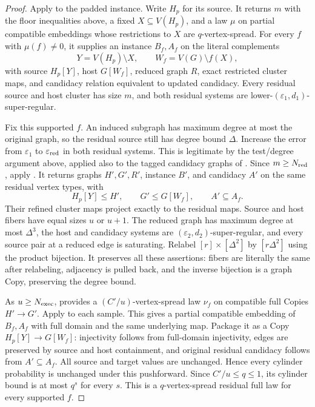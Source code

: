\begin{proof}
Apply  to the padded instance. Write $H_p$
for its source. It returns $m$ with the floor inequalities above, a fixed
$X\subseteq V(H_p)$, and a law $\mu$ on partial compatible embeddings
whose restrictions to $X$ are $q$-vertex-spread. For every $f$ with
$\mu(f)\ne0$, it supplies an instance $B_f,A_f$ on the literal complements
\[
 Y=V(H_p)\setminus X,\qquad W_f=V(G)\setminus f(X),
\]
with source $H_p[Y]$, host $G[W_f]$, reduced graph $R$, exact restricted
cluster maps, and candidacy relation equivalent to updated candidacy.
Every residual source and host cluster has size $m$, and both residual
systems are lower-$(\varepsilon_1,d_1)$-super-regular.

Fix this supported $f$. An induced subgraph has maximum degree at most
the original graph, so the residual source still has degree bound $\Delta$.
Increase the error from $\varepsilon_1$ to $\varepsilon_{\rm red}$ in
both residual systems. This is legitimate by the test/degree argument
above, applied also to the tagged candidacy graphs of
. Since $m\geq N_{\rm red}$, apply
. It returns graphs $H',G',R'$,
instance $B'$, and candidacy $A'$ on the same residual vertex types, with
\[
 H_p[Y]\leq H',\qquad G'\leq G[W_f],\qquad A'\subseteq A_f.
\]
Their refined cluster maps project exactly to the residual maps. Source
and host fibers have equal sizes $u$ or $u+1$. The reduced graph has
maximum degree at most $\Delta^3$, the host and candidacy systems are
$(\varepsilon_2,d_2)$-super-regular, and every source pair at a reduced
edge is saturating. Relabel $[r]\times[\Delta^2]$ by $[r\Delta^2]$
using the product bijection. It preserves all these assertions: fibers
are literally the same after relabeling, adjacency is pulled back, and
the inverse bijection is a graph Copy, preserving the degree bound.

As $u\geq N_{\rm exec}$,  provides a
$(C'/u)$-vertex-spread law $\nu_f$ on compatible full Copies $H'\to G'$.
Apply  to each sample. This gives a
partial compatible embedding of $B_f,A_f$ with full domain and the same
underlying map. Package it as a Copy $H_p[Y]\to G[W_f]$: injectivity
follows from full-domain injectivity, edges are preserved by source and
host containment, and original residual candidacy follows from
$A'\subseteq A_f$. All source and target values are unchanged. Hence
every cylinder probability is unchanged under this pushforward. Since
$C'/u\leq q\leq1$, its cylinder bound is at most $q^s$ for every $s$.
This is a $q$-vertex-spread residual full law for every supported $f$.


\end{proof}
